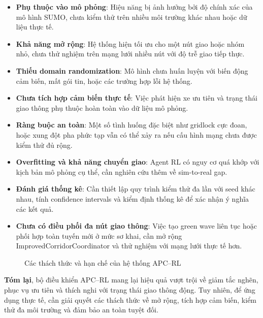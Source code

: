 \begin{itemize}
    \item \textbf{Phụ thuộc vào mô phỏng}: Hiệu năng bị ảnh hưởng bởi độ chính xác của mô hình SUMO, chưa kiểm thử trên nhiều môi trường khác nhau hoặc dữ liệu thực tế.
    \item \textbf{Khả năng mở rộng}: Hệ thống hiện tối ưu cho một nút giao hoặc nhóm nhỏ, chưa thử nghiệm trên mạng lưới nhiều nút với độ trễ giao tiếp thực.
    \item \textbf{Thiếu domain randomization}: Mô hình chưa huấn luyện với biến động cảm biến, mất gói tin, hoặc các trường hợp lỗi hệ thống.
    \item \textbf{Chưa tích hợp cảm biến thực tế}: Việc phát hiện xe ưu tiên và trạng thái giao thông phụ thuộc hoàn toàn vào dữ liệu mô phỏng.
    \item \textbf{Ràng buộc an toàn}: Một số tình huống đặc biệt như gridlock cực đoan, hoặc xung đột pha phức tạp vẫn có thể xảy ra nếu cấu hình mạng chưa được kiểm thử đủ rộng.
    \item \textbf{Overfitting và khả năng chuyển giao}: Agent RL có nguy cơ quá khớp với kịch bản mô phỏng cụ thể, cần nghiên cứu thêm về sim-to-real gap.
    \item \textbf{Đánh giá thống kê}: Cần thiết lập quy trình kiểm thử đa lần với seed khác nhau, tính confidence intervals và kiểm định thống kê để xác nhận ý nghĩa các kết quả.
    \item \textbf{Chưa có điều phối đa nút giao thông}: Việc tạo green wave liên tục hoặc phối hợp toàn tuyến mới ở mức sơ khai, cần mở rộng ImprovedCorridorCoordinator và thử nghiệm với mạng lưới thực tế hơn.
\end{itemize}

\begin{figure}[H]
    \centering
    \caption{Các thách thức và hạn chế của hệ thống APC–RL}
    \label{fig:system_limitations}
\end{figure}

\noindent\textbf{Tóm lại}, bộ điều khiển APC–RL mang lại hiệu quả vượt trội về giảm tắc nghẽn, phục vụ ưu tiên và thích nghi với trạng thái giao thông động. Tuy nhiên, để ứng dụng thực tế, cần giải quyết các thách thức về mở rộng, tích hợp cảm biến, kiểm thử đa môi trường và đảm bảo an toàn tuyệt đối.